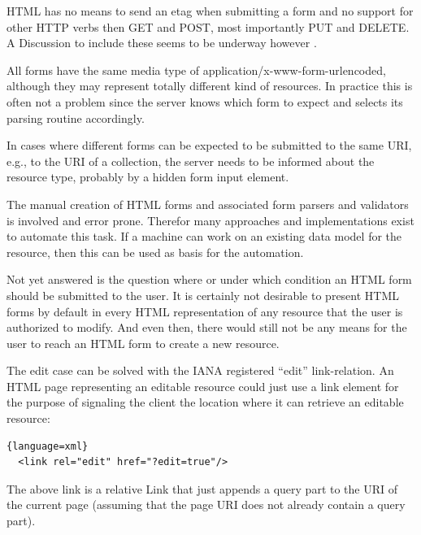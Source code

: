 \documentclass[11pt,a4paper,headsepline,twoside]{scrartcl}		%
\begin{document}
HTML has no means to send an etag when submitting a form and no support for
other HTTP verbs then GET and POST, most importantly PUT and DELETE. A
Discussion to include these seems to be underway however \cite{Amundsen2011}.

All forms have the same media type of application/x-www-form-urlencoded,
although they may represent totally different kind of resources. In practice
this is often not a problem since the server knows which form to expect and
selects its parsing routine accordingly.

In cases where different forms can be expected to be submitted to the same URI,
e.g., to the URI of a collection, the server needs to be informed about the
resource type, probably by a hidden form input element.

The manual creation of HTML forms and associated form parsers and validators is
involved and error prone. Therefor many approaches and implementations exist to
automate this task. If a machine can work on an existing data model for the
resource, then this can be used as basis for the automation.

%

Not yet answered is the question where or under which condition an HTML form
should be submitted to the user. It is certainly not desirable to present HTML
forms by default in every HTML representation of any resource that the user is
authorized to modify. And even then, there would still not be any means for the
user to reach an HTML form to create a new resource.

The edit case can be solved with the IANA registered ``edit'' link-relation. An
HTML page representing an editable resource could just use a link element for
the purpose of signaling the client the location where it can retrieve an
editable resource:

\begin{lstlisting}{language=xml}
  <link rel="edit" href="?edit=true"/>
\end{lstlisting}

The above link is a relative Link that just appends a query part to the URI of
the current page (assuming that the page URI does not already contain a query
part).
\end{document}
